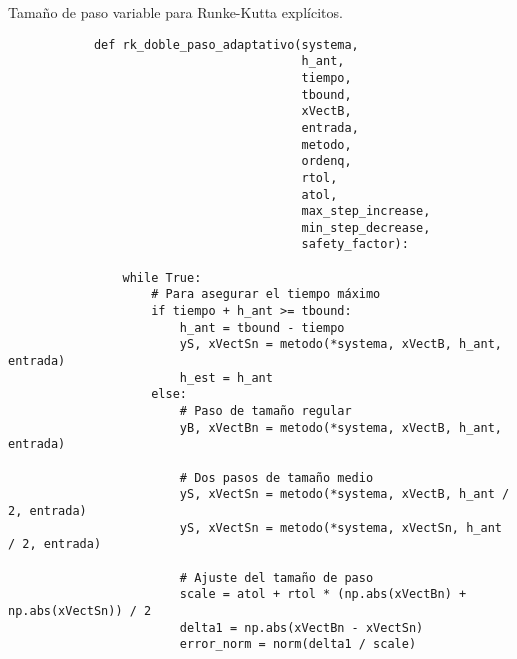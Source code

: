     
    \begin{longlisting}
        \caption[Tamaño de paso variable para Runke-Kutta explícitos]{Tamaño de paso variable para Runke-Kutta explícitos.}
        \label{code:explicitos}				
        \begin{verbatim}
            def rk_doble_paso_adaptativo(systema,
                                         h_ant,
                                         tiempo,
                                         tbound,
                                         xVectB,
                                         entrada,
                                         metodo,
                                         ordenq,
                                         rtol,
                                         atol,
                                         max_step_increase,
                                         min_step_decrease,
                                         safety_factor):
                
                while True:
                    # Para asegurar el tiempo máximo
                    if tiempo + h_ant >= tbound:
                        h_ant = tbound - tiempo
                        yS, xVectSn = metodo(*systema, xVectB, h_ant, entrada)
                        h_est = h_ant
                    else:
                        # Paso de tamaño regular
                        yB, xVectBn = metodo(*systema, xVectB, h_ant, entrada)

                        # Dos pasos de tamaño medio
                        yS, xVectSn = metodo(*systema, xVectB, h_ant / 2, entrada)
                        yS, xVectSn = metodo(*systema, xVectSn, h_ant / 2, entrada)

                        # Ajuste del tamaño de paso
                        scale = atol + rtol * (np.abs(xVectBn) + np.abs(xVectSn)) / 2
                        delta1 = np.abs(xVectBn - xVectSn)
                        error_norm = norm(delta1 / scale)


\end{verbatim}
\end{longlisting}
